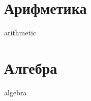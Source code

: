\documentclass[10pt, a4paper]{article}
\begin{document}
\part{Арифметика}
{arithmetic}
\part{Алгебра}
{algebra}
\end{document}
